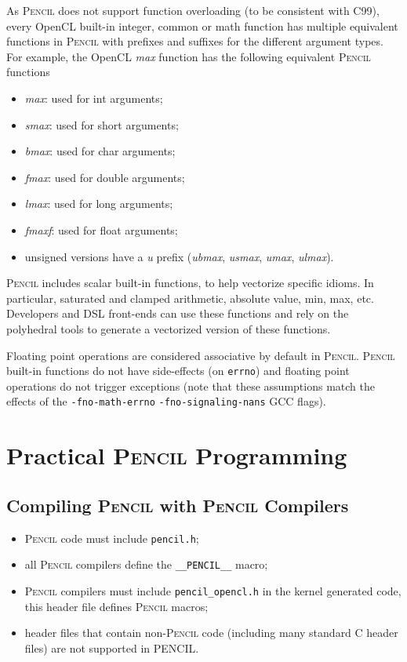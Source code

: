 \documentclass{carp}
\newcommand\pencil{\textsc{Pencil}\xspace}
\begin{document}
As \pencil does not support function overloading (to be consistent
with C99), every OpenCL built-in integer, common or math function
has multiple equivalent functions in \pencil with prefixes and
suffixes for the different argument types.
For example, the OpenCL \emph{max} function has the
following equivalent \pencil functions
\begin{itemize}
 \item \emph{max}: used for int arguments;
 \item \emph{smax}: used for short arguments;
 \item \emph{bmax}: used for char arguments;
 \item \emph{fmax}: used for double arguments;
 \item \emph{lmax}: used for long arguments;
 \item \emph{fmaxf}: used for float arguments;
 \item unsigned versions have a \emph{u} prefix
 (\emph{ubmax}, \emph{usmax}, \emph{umax}, \emph{ulmax}).
\end{itemize}

\pencil includes scalar built-in functions, to help vectorize specific
idioms. In particular, saturated and clamped arithmetic, absolute
value, min, max, etc.  Developers and DSL front-ends can use these
functions and rely on the polyhedral tools to generate a vectorized
version of these functions.

Floating point operations are considered associative by default in \pencil.
\pencil built-in functions do not have side-effects (on \texttt{errno})
and floating point operations do not trigger exceptions (note that these
assumptions match the effects of the \texttt{-fno-math-errno}
\texttt{-fno-signaling-nans} GCC flags).

\chapter{Practical \pencil Programming}

\section{Compiling \pencil with \pencil Compilers}
\begin{itemize}
 \item \pencil code must include \texttt{pencil.h};
 \item all \pencil compilers define the \lstinline!__PENCIL__! macro;
 \item \pencil compilers must include \lstinline!pencil_opencl.h!
        in the kernel generated code, this header file defines \pencil
        macros;
 \item header files that contain non-\pencil code (including many
       standard C header files) are not supported in PENCIL.
\end{itemize}
\end{document}
